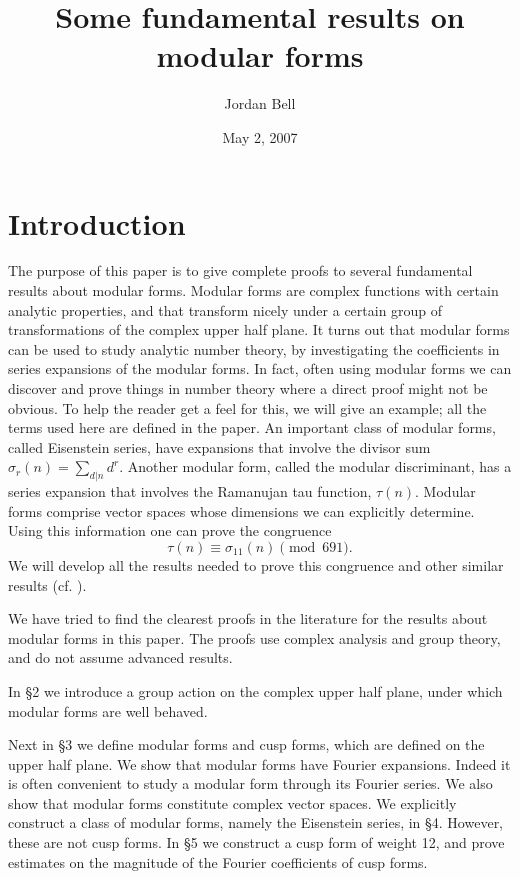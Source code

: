 \documentclass{article}
\begin{document}
\title{Some fundamental results on modular forms}
\author{Jordan Bell}
\date{May 2, 2007}
\maketitle

\section{Introduction}
The purpose of this paper is to give complete proofs to several fundamental results about modular forms. Modular forms
are complex functions with certain analytic properties, and that transform nicely under a certain group of transformations
of the complex upper half plane. It turns out that modular forms can be used to study analytic number theory, by investigating
the coefficients in series expansions of the modular forms. In fact, often using
modular forms we can discover and prove things in number theory where a direct proof might not be obvious.
To help the reader get a feel for this, we will give an example; all the terms used here are defined in the paper.
An important class of modular forms, called Eisenstein series, have expansions that involve the divisor sum
$\sigma_r(n)=\sum_{d|n}d^r$. Another modular form, called the modular discriminant, has a series
expansion that involves the Ramanujan tau function, $\tau(n)$. Modular forms comprise vector spaces whose
dimensions we can explicitly determine. Using this  information one can prove
the congruence
\[
\tau(n) \equiv \sigma_{11}(n) \pmod{691}.
\]
We will develop all the results needed to prove this congruence and other similar
results (cf. \cite{MR938970}).

We have tried to find the clearest proofs in the literature for the results about modular forms in this paper.
The proofs use complex analysis and group theory, and do not assume advanced results.

In \S 2 we introduce a group action on the complex upper half plane, under which modular forms are well behaved.

Next in \S 3 we define modular forms and cusp forms, which are defined on the upper half plane.
We show that modular forms have Fourier expansions. Indeed it is often convenient to study a modular form through its
Fourier series. We also show that modular forms constitute complex vector spaces.
We explicitly construct 
a class of modular forms, namely the Eisenstein series, in \S 4. However, these are not cusp forms.
In \S 5 we construct a cusp form of weight 12,
and prove estimates on the magnitude of the Fourier coefficients of cusp forms.
\end{document}
